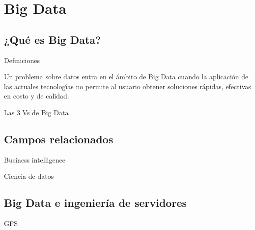 
\section{Big Data}

	\subsection*{¿Qué es Big Data?}

		\begin{frame}{Definiciones}

			\begin{tcolorbox}[colback=blue!5,colframe=blue!15]
				Un problema sobre datos entra en el ámbito de Big Data cuando la aplicación de las actuales tecnologı́as no permite al usuario obtener soluciones rápidas, efectivas en costo y de calidad.
			\end{tcolorbox}
		\end{frame}

		\begin{frame}{Las 3 Vs de Big Data}
			
		\end{frame}

	
	\subsection*{Campos relacionados}

		\begin{frame}{Business intelligence}
			
			
		\end{frame}
		
		\begin{frame}{Ciencia de datos}
			
			
		\end{frame}
		

	\subsection*{Big Data e ingeniería de servidores}
	
		\begin{frame}{GFS}
			
			
		\end{frame}
